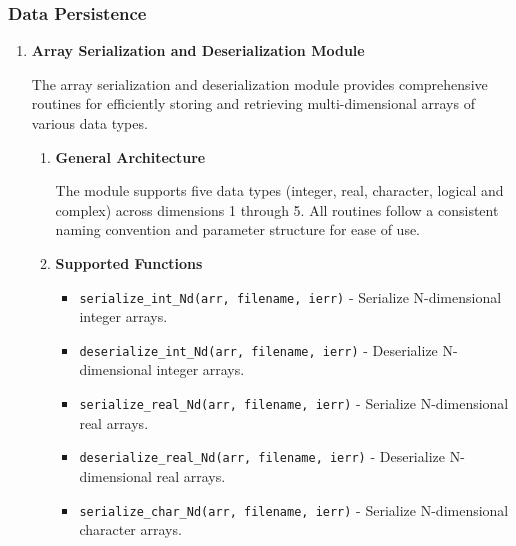 \subsubsection{Data Persistence}
\begin{enumerate}
    \item \textbf{Array Serialization and Deserialization Module}
          
          The array serialization and deserialization module provides comprehensive routines
          for efficiently storing and retrieving multi-dimensional arrays of various
          data types.
          
          \begin{enumerate}
            \item \textbf{General Architecture}
                  
                  The module supports five data types (integer, real, character, logical
                  and complex) across dimensions 1 through 5. All routines follow a
                  consistent naming convention and parameter structure for ease of use.
                  
            \item \textbf{Supported Functions}
                  
                  \begin{itemize}
                    \item \texttt{serialize\_int\_Nd(arr, filename, ierr)} - Serialize N-dimensional
                          integer arrays.
                          
                    \item \texttt{deserialize\_int\_Nd(arr, filename, ierr)} -
                          Deserialize N-dimensional integer arrays.
                          
                    \item \texttt{serialize\_real\_Nd(arr, filename, ierr)} - Serialize
                          N-dimensional real arrays.
                          
                    \item \texttt{deserialize\_real\_Nd(arr, filename, ierr)} -
                          Deserialize N-dimensional real arrays.
                          
                    \item \texttt{serialize\_char\_Nd(arr, filename, ierr)} - Serialize
                          N-dimensional character arrays.
                          

\end{itemize}
\end{enumerate}
\end{enumerate}
